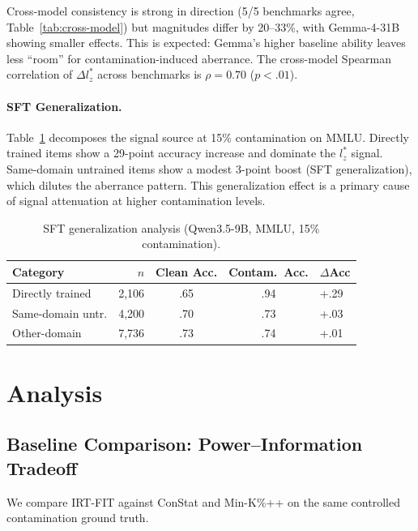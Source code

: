 \documentclass[11pt,a4paper]{article}
\begin{document}
Cross-model consistency is strong in direction (5/5 benchmarks agree, Table~\ref{tab:cross-model}) but magnitudes differ by 20--33\%, with Gemma-4-31B showing smaller effects.
This is expected: Gemma's higher baseline ability leaves less ``room'' for contamination-induced aberrance.
The cross-model Spearman correlation of $\Delta l_{z}^{*}$ across benchmarks is $\rho=0.70$ ($p<.01$).

\paragraph{SFT Generalization.}
Table~\ref{tab:sft-gen} decomposes the signal source at 15\% contamination on MMLU.
Directly trained items show a 29-point accuracy increase and dominate the $l_{z}^{*}$ signal.
Same-domain untrained items show a modest 3-point boost (SFT generalization), which dilutes the aberrance pattern.
This generalization effect is a primary cause of signal attenuation at higher contamination levels.

\begin{table}[t]
\centering
\caption{SFT generalization analysis (Qwen3.5-9B, MMLU, 15\% contamination).}
\label{tab:sft-gen}
\small
\begin{tabular}{lrccl}
\toprule
\textbf{Category} & $n$ & \textbf{Clean Acc.} & \textbf{Contam.\ Acc.} & \textbf{$\Delta$Acc} \\
\midrule
Directly trained  & 2{,}106 & .65 & .94 & +.29 \\
Same-domain untr. & 4{,}200 & .70 & .73 & +.03 \\
Other-domain      & 7{,}736 & .73 & .74 & +.01 \\
\bottomrule
\end{tabular}
\end{table}


\section{Analysis}

\subsection{Baseline Comparison: Power--Information Tradeoff}
\label{sec:baselines}

We compare IRT-FIT against ConStat and Min-K\%++ on the same controlled contamination ground truth.
\end{document}
